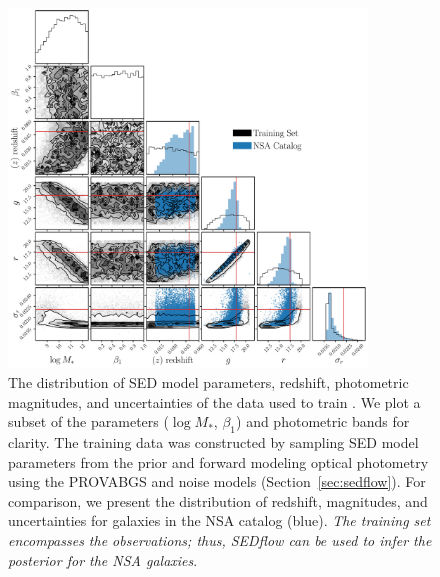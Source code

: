 \begin{figure}
\begin{center}
\includegraphics[width=0.85\textwidth]{figs/training.pdf}
    \caption{\label{fig:data}
    The distribution of SED model parameters, redshift, photometric
    magnitudes, and uncertainties of the data used to train \sedflow.
    We plot a subset of the parameters ($\log M_*$, $\beta_1$) and photometric
    bands for clarity.
    The training data was constructed by sampling SED model parameters from the
    prior and forward modeling optical photometry using the PROVABGS and noise
    models (Section~\ref{sec:sedflow}). 
    For comparison, we present the distribution of redshift, magnitudes, and
    uncertainties for galaxies in the NSA catalog (blue). 
    \emph{The training set encompasses the observations; thus, {\sc SEDflow}
    can be used to infer the posterior for the NSA galaxies}.
    }
\end{center}
\end{figure}

